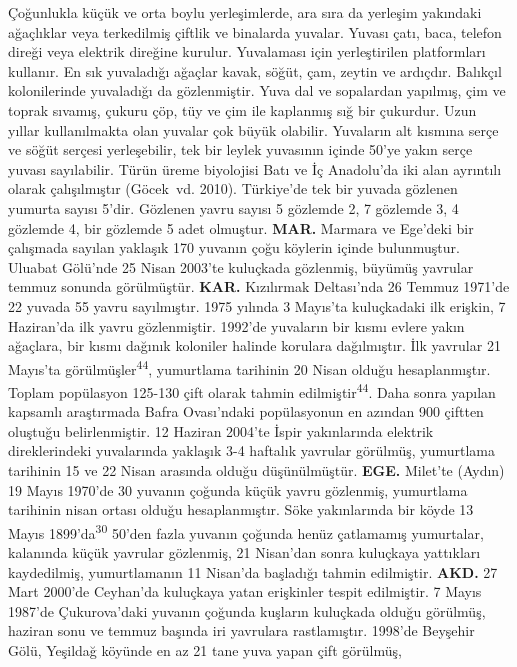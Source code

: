 \documentclass[
  letterpaper,
  DIV=11,
  numbers=noendperiod]{scrreprt}
\begin{document}
Çoğunlukla küçük ve orta boylu yerleşimlerde, ara sıra da yerleşim
yakındaki ağaçlıklar veya terkedilmiş çiftlik ve binalarda yuvalar.
Yuvası çatı, baca, telefon direği veya elektrik direğine kurulur.
Yuvalaması için yerleştirilen platformları kullanır. En sık yuvaladığı
ağaçlar kavak, söğüt, çam, zeytin ve ardıçdır. Balıkçıl kolonilerinde
yuvaladığı da gözlenmiştir. Yuva dal ve sopalardan yapılmış, çim ve
toprak sıvamış, çukuru çöp, tüy ve çim ile kaplanmış sığ bir çukurdur.
Uzun yıllar kullanılmakta olan yuvalar çok büyük olabilir. Yuvaların alt
kısmına serçe ve söğüt serçesi yerleşebilir, tek bir leylek yuvasının
içinde 50'ye yakın serçe yuvası sayılabilir. Türün üreme biyolojisi Batı
ve İç Anadolu'da iki alan ayrıntılı olarak çalışılmıştır (Göcek~vd.
2010). Türkiye'de tek bir yuvada gözlenen yumurta sayısı 5'dir. Gözlenen
yavru sayısı 5 gözlemde 2, 7 gözlemde 3, 4 gözlemde 4, bir gözlemde 5
adet olmuştur. \textbf{MAR.} Marmara ve Ege'deki bir çalışmada sayılan
yaklaşık 170 yuvanın çoğu köylerin içinde bulunmuştur. Uluabat Gölü'nde
25 Nisan 2003'te kuluçkada gözlenmiş, büyümüş yavrular temmuz sonunda
görülmüştür. \textbf{KAR.} Kızılırmak Deltası'nda 26 Temmuz 1971'de 22
yuvada 55 yavru sayılmıştır. 1975 yılında 3 Mayıs'ta kuluçkadaki ilk
erişkin, 7 Haziran'da ilk yavru gözlenmiştir. 1992'de yuvaların bir
kısmı evlere yakın ağaçlara, bir kısmı dağınık koloniler halinde
korulara dağılmıştır. İlk yavrular 21 Mayıs'ta
görülmüşler\textsuperscript{44}, yumurtlama tarihinin 20 Nisan olduğu
hesaplanmıştır. Toplam popülasyon 125-130 çift olarak tahmin
edilmiştir\textsuperscript{44}. Daha sonra yapılan kapsamlı araştırmada
Bafra Ovası'ndaki popülasyonun en azından 900 çiftten oluştuğu
belirlenmiştir. 12 Haziran 2004'te İspir yakınlarında elektrik
direklerindeki yuvalarında yaklaşık 3-4 haftalık yavrular görülmüş,
yumurtlama tarihinin 15 ve 22 Nisan arasında olduğu düşünülmüştür.
\textbf{EGE.} Milet'te (Aydın) 19 Mayıs 1970'de 30 yuvanın çoğunda küçük
yavru gözlenmiş, yumurtlama tarihinin nisan ortası olduğu
hesaplanmıştır. Söke yakınlarında bir köyde 13 Mayıs
1899'da\textsuperscript{30} 50'den fazla yuvanın çoğunda henüz
çatlamamış yumurtalar, kalanında küçük yavrular gözlenmiş, 21 Nisan'dan
sonra kuluçkaya yattıkları kaydedilmiş, yumurtlamanın 11 Nisan'da
başladığı tahmin edilmiştir. \textbf{AKD.} 27 Mart 2000'de Ceyhan'da
kuluçkaya yatan erişkinler tespit edilmiştir. 7 Mayıs 1987'de
Çukurova'daki yuvanın çoğunda kuşların kuluçkada olduğu görülmüş,
haziran sonu ve temmuz başında iri yavrulara rastlamıştır. 1998'de
Beyşehir Gölü, Yeşildağ köyünde en az 21 tane yuva yapan çift görülmüş,
\end{document}

